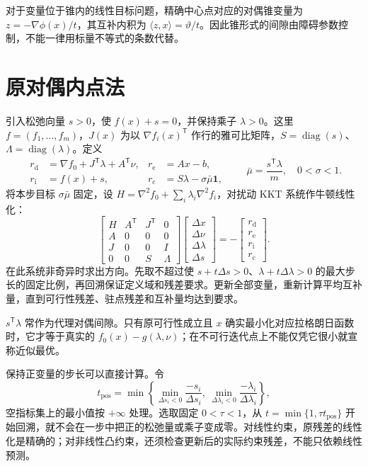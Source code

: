 对于变量位于锥内的线性目标问题，精确中心点对应的对偶锥变量为 $z=-\nabla\phi(x)/t$，其互补内积为 $\langle z,x\rangle=\vartheta/t$。因此锥形式的间隙由障碍参数控制，不能一律用标量不等式的条数代替。

\section{原对偶内点法}

引入松弛向量 $s>0$，使 $f(x)+s=0$，并保持乘子 $\lambda>0$。这里 $f=(f_1,\ldots,f_m)$，$J(x)$ 为以 $\nabla f_i(x)^{\mathsf T}$ 作行的雅可比矩阵，$S=\operatorname{diag}(s)$、$\Lambda=\operatorname{diag}(\lambda)$。定义
\[
 \begin{aligned}
 r_{\mathrm d}&=\nabla f_0+J^{\mathsf T}\lambda+A^{\mathsf T}\nu,&
 r_{\mathrm e}&=Ax-b,\\
 r_{\mathrm i}&=f(x)+s,&
 r_{\mathrm c}&=S\lambda-\sigma\bar\mu\mathbf1,
 \end{aligned}
 \qquad \bar\mu=\frac{s^{\mathsf T}\lambda}{m},\quad0<\sigma<1.
\]
将本步目标 $\sigma\bar\mu$ 固定，设 $H=\nabla^2f_0+\sum_i\lambda_i\nabla^2f_i$，对扰动 KKT 系统作牛顿线性化：
\[
 \begin{bmatrix}
 H&A^{\mathsf T}&J^{\mathsf T}&0\\
 A&0&0&0\\
 J&0&0&I\\
 0&0&S&\Lambda
 \end{bmatrix}
 \begin{bmatrix}\Delta x\\\Delta\nu\\\Delta\lambda\\\Delta s\end{bmatrix}
 =-\begin{bmatrix}r_{\mathrm d}\\r_{\mathrm e}\\r_{\mathrm i}\\r_{\mathrm c}\end{bmatrix}.
\]
在此系统非奇异时求出方向。先取不超过使 $s+t\Delta s>0$、$\lambda+t\Delta\lambda>0$ 的最大步长的固定比例，再回溯保证定义域和残差要求。更新全部变量，重新计算平均互补量，直到可行性残差、驻点残差和互补量均达到要求。

$s^{\mathsf T}\lambda$ 常作为代理对偶间隙。只有原可行性成立且 $x$ 确实最小化对应拉格朗日函数时，它才等于真实的 $f_0(x)-g(\lambda,\nu)$；在不可行迭代点上不能仅凭它很小就宣称近似最优。

保持正变量的步长可以直接计算。令
\[
 t_{\mathrm{pos}}=\min\left\{
 \min_{\Delta s_i<0}\frac{-s_i}{\Delta s_i},
 \ \min_{\Delta\lambda_i<0}\frac{-\lambda_i}{\Delta\lambda_i}
 \right\},
\]
空指标集上的最小值按 $+\infty$ 处理。选取固定 $0<\tau<1$，从 $t=\min\{1,\tau t_{\mathrm{pos}}\}$ 开始回溯，就不会在一步中把正的松弛量或乘子变成零。对线性约束，原残差的线性化是精确的；对非线性凸约束，还须检查更新后的实际约束残差，不能只依赖线性预测。

